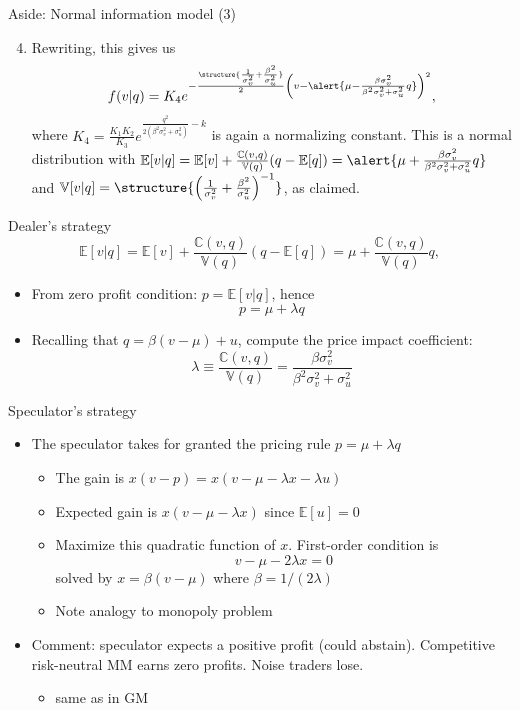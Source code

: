 \documentclass[english,10pt
,aspectratio=169
]{beamer}
\begin{document}
\begin{frame}{Aside: Normal information model (3)}
	\begin{enumerate}
		\setcounter{enumi}{3}
		\item Rewriting, this gives us
		\[
			f(v|q) = K_4 e^{-\frac{\structure{\frac{1}{\sigma^2_v}+\frac{\beta^2}{\sigma^2_u}}}{2} \left(v-\alert{\mu-\frac{\beta \sigma^2_v}{\beta^2 \sigma^2_v + \sigma^2_u}q }\right)^2},
		\]
		where $K_4=\frac{K_1 K_2}{K_3}e^{ \frac{q^2}{2(\beta^2 \sigma^2_v + \sigma^2_u)}-k}$ is again a normalizing constant.
		This is  a normal distribution with $\mathbb{E}[v|q] = \mathbb{E}[v] + \frac{\mathbb{C}(v,q)}{\mathbb{V}(q)} (q-\mathbb{E}[q]) = \alert{\mu+\frac{\beta \sigma^2_v}{\beta^2 \sigma^2_v + \sigma^2_u}q}$ and $\mathbb{V}[v|q]=\structure{ \left( \frac{1}{\sigma^2_v}+\frac{\beta^2}{\sigma^2_u} \right)^{-1}}$, as claimed. 
	\end{enumerate}
\end{frame}


\begin{frame}{Dealer's strategy}
	\[
		\mathbb{E}[v|q] = \mathbb{E}[v] + \frac{\mathbb{C}(v,q)}{\mathbb{V}(q)} (q-\mathbb{E}[q]) = \mu + \frac{\mathbb{C}(v,q)}{\mathbb{V}(q)} q,
	\]
	\begin{itemize}
		\item From zero profit condition: $p = \mathbb{E}[v|q]$, hence
		\[
			p = \mu + \lambda q
		\]
		\item Recalling that $q = \beta(v-\mu) + u$, compute the price impact coefficient: 
		\[
			\lambda \equiv \frac{\mathbb{C}(v,q)}{\mathbb{V}(q)} = \frac{\beta \sigma^2_v}{\beta^2 \sigma^2_v + \sigma^2_u}	
		\]
	\end{itemize}
\end{frame}


\begin{frame}{Speculator's strategy}
	\begin{itemize}
		\item The speculator takes for granted the pricing rule $p=\mu+\lambda q$
		\begin{itemize}
			\item The gain is $x(v-p) = x(v-\mu-\lambda x - \lambda u)$
			\item Expected gain is $x(v-\mu-\lambda x)$ since $\mathbb{E}[u]=0$
			\item Maximize this quadratic function of $x$. First-order condition is
			\[
			v-\mu -2\lambda x=0
			\]
			solved by $x=\beta(v-\mu)$ where $\beta=1/(2\lambda)$
			\item Note analogy to monopoly problem
		\end{itemize}
		\item Comment: speculator expects a positive profit (could abstain). Competitive risk-neutral MM earns zero profits. Noise traders lose.
		\begin{itemize}
			\item same as in GM
		\end{itemize}
	\end{itemize}
\end{frame}
\end{document}
